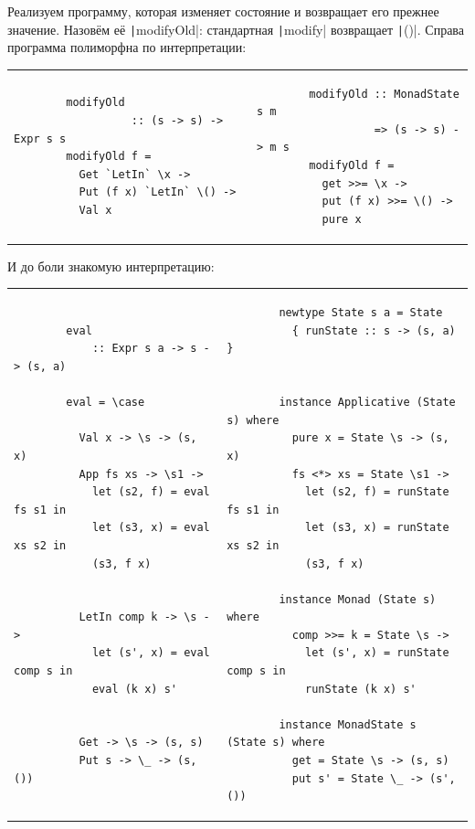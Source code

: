 Реализуем программу, которая изменяет состояние и возвращает его прежнее значение.
Назовём её \texttt|modifyOld|: стандартная \texttt|modify| возвращает \texttt|()|.
Справа программа полиморфна по интерпретации:

\begin{tabular}{p{8cm}p{8cm}}
    \begin{verbatim}
        modifyOld
                  :: (s -> s) -> Expr s s
        modifyOld f =
          Get `LetIn` \x ->
          Put (f x) `LetIn` \() ->
          Val x
    \end{verbatim}
    &
    \begin{verbatim}
        modifyOld :: MonadState s m
                  => (s -> s) -> m s
        modifyOld f =
          get >>= \x ->
          put (f x) >>= \() ->
          pure x
    \end{verbatim}
\end{tabular}
\vspace{1em}

И до боли знакомую интерпретацию:

\begin{tabular}{p{8cm}p{8cm}}
    \begin{verbatim}
        eval
            :: Expr s a -> s -> (s, a)

        eval = \case

          Val x -> \s -> (s, x)
          App fs xs -> \s1 ->
            let (s2, f) = eval fs s1 in
            let (s3, x) = eval xs s2 in
            (s3, f x)


          LetIn comp k -> \s ->
            let (s', x) = eval comp s in
            eval (k x) s'


          Get -> \s -> (s, s)
          Put s -> \_ -> (s, ())
    \end{verbatim}
    &
    \begin{verbatim}
        newtype State s a = State
          { runState :: s -> (s, a) }


        instance Applicative (State s) where
          pure x = State \s -> (s, x)
          fs <*> xs = State \s1 ->
            let (s2, f) = runState fs s1 in
            let (s3, x) = runState xs s2 in
            (s3, f x)

        instance Monad (State s) where
          comp >>= k = State \s ->
            let (s', x) = runState comp s in
            runState (k x) s'

        instance MonadState s (State s) where
          get = State \s -> (s, s)
          put s' = State \_ -> (s', ())
    \end{verbatim}
\end{tabular}
\vspace{1em}


